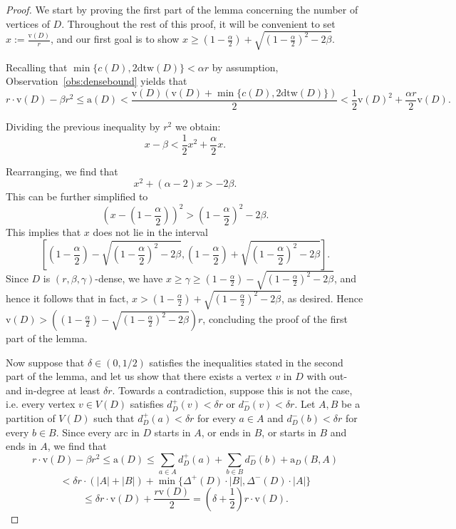 \documentclass[10pt,a4paper]{amsart}
\begin{document}
\begin{proof}
We start by proving the first part of the lemma concerning the number of vertices of $D$. Throughout the rest of this proof, it will be convenient to set $x:=\frac{\mathrm{v}(D)}{r}$, and our first goal is to show $x\ge \left(1-\frac{\alpha}{2}\right)+\sqrt{\left(1-\frac{\alpha}{2}\right)^2-2\beta}$. 

Recalling that $\min\{c(D),2\mathrm{dtw}(D)\}<\alpha r$ by assumption, Observation~\ref{obs:densebound} yields that
$$r\cdot \mathrm{v}(D)-\beta r^2\le \mathrm{a}(D)<\frac{\mathrm{v}(D)(\mathrm{v}(D)+\min\{c(D),2\mathrm{dtw}(D)\})}{2}<\frac{1}{2}\mathrm{v}(D)^2+\frac{\alpha r}{2}\mathrm{v}(D).$$

Dividing the previous inequality by $r^2$ we obtain:
$$x-\beta<\frac{1}{2}x^2+\frac{\alpha}{2}x.$$

Rearranging, we find that
$$x^2+(\alpha-2)x>-2\beta.$$
This can be further simplified to 
$$\left(x-\left(1-\frac{\alpha}{2}\right)\right)^2>\left(1-\frac{\alpha}{2}\right)^2-2\beta.$$ This implies that $x$ does not lie in the interval 
$$\left[\left(1-\frac{\alpha}{2}\right)-\sqrt{\left(1-\frac{\alpha}{2}\right)^2-2\beta},\left(1-\frac{\alpha}{2}\right)+\sqrt{\left(1-\frac{\alpha}{2}\right)^2-2\beta}\right].$$ Since $D$ is $(r,\beta,\gamma)$-dense, we have $x\ge \gamma\ge \left(1-\frac{\alpha}{2}\right)-\sqrt{\left(1-\frac{\alpha}{2}\right)^2-2\beta}$, and hence it follows that in fact, $x>\left(1-\frac{\alpha}{2}\right)+\sqrt{\left(1-\frac{\alpha}{2}\right)^2-2\beta}$, as desired. Hence $\mathrm{v}(D)>\left(\left(1-\frac{\alpha}{2}\right)-\sqrt{\left(1-\frac{\alpha}{2}\right)^2-2\beta}\right)r$, concluding the proof of the first part of the lemma.

Now suppose that $\delta\in (0,1/2)$ satisfies the inequalities stated in the second part of the lemma, and let us show that there exists a vertex $v$ in $D$ with out- and in-degree at least $\delta r$.
Towards a contradiction, suppose this is not the case, i.e. every vertex $v\in V(D)$ satisfies $d_D^+(v)<\delta r$ or $d_D^-(v)<\delta r$. Let $A, B$ be a partition of $V(D)$ such that $d_D^+(a)<\delta r$ for every $a\in A$ and $d_D^-(b)<\delta r$ for every $b\in B$. Since every arc in $D$ starts in $A$, or ends in $B$, or starts in $B$ and ends in $A$, we find that
$$r\cdot \mathrm{v}(D)-\beta r^2\le \mathrm{a}(D)\le \sum_{a\in A}d_D^+(a)+\sum_{b\in B}d_D^-(b)+\mathrm{a}_D(B,A)$$
$$<\delta r\cdot (|A|+|B|)+\min\{\Delta^+(D)\cdot |B|,\Delta^-(D)\cdot |A|\}$$
$$\le \delta r \cdot \mathrm{v}(D)+\frac{r\mathrm{v}(D)}{2}=\left(\delta+\frac{1}{2}\right)r\cdot \mathrm{v}(D).$$


\end{proof}
\end{document}

